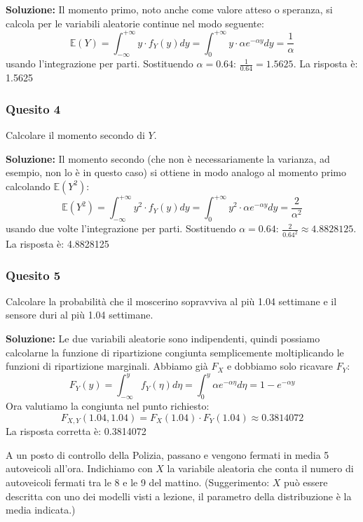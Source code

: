 \documentclass[12pt, a4paper]{article}
\begin{document}
\textbf{Soluzione:}
Il momento primo, noto anche come valore atteso o speranza, si calcola per le variabili aleatorie continue nel modo seguente:
$$ \mathbb{E}(Y) = \int_{-\infty}^{+\infty} y \cdot f_Y(y) dy = \int_0^{+\infty} y \cdot \alpha e^{-\alpha y} dy = \frac{1}{\alpha} $$
usando l’integrazione per parti. Sostituendo $\alpha=0.64$: $\frac{1}{0.64} = 1.5625$.
La risposta è: 1.5625

\newpage

\subsubsection*{Quesito 4}
Calcolare il momento secondo di $Y$.

\textbf{Soluzione:}
Il momento secondo (che non è necessariamente la varianza, ad esempio, non lo è in questo caso) si ottiene in modo analogo al momento primo calcolando $\mathbb{E}(Y^2)$:
$$ \mathbb{E}(Y^2) = \int_{-\infty}^{+\infty} y^2 \cdot f_Y(y) dy = \int_0^{+\infty} y^2 \cdot \alpha e^{-\alpha y} dy = \frac{2}{\alpha^2} $$
usando due volte l’integrazione per parti. Sostituendo $\alpha=0.64$: $\frac{2}{0.64^2} \approx 4.8828125$.
La risposta è: 4.8828125

\subsubsection*{Quesito 5}
Calcolare la probabilità che il moscerino sopravviva al più 1.04 settimane e il sensore duri al più 1.04 settimane.

\textbf{Soluzione:}
Le due variabili aleatorie sono indipendenti, quindi possiamo calcolarne la funzione di ripartizione congiunta semplicemente moltiplicando le funzioni di ripartizione marginali. Abbiamo già $F_X$ e dobbiamo solo ricavare $F_Y$:
$$ F_Y(y) = \int_{-\infty}^y f_Y(\eta) d\eta = \int_0^y \alpha e^{-\alpha \eta} d\eta = 1 - e^{-\alpha y} $$
Ora valutiamo la congiunta nel punto richiesto:
$$ F_{X,Y}(1.04, 1.04) = F_X(1.04) \cdot F_Y(1.04) \approx 0.3814072 $$
La risposta corretta è: 0.3814072


\vspace{0.5cm}
\begin{tcolorbox}[colback=lightergray!10, colframe=tocsec, title=\textbf{Esercizio 4}]
A un posto di controllo della Polizia, passano e vengono fermati in media 5 autoveicoli all’ora. Indichiamo con $X$ la variabile aleatoria che conta il numero di autoveicoli fermati tra le 8 e le 9 del mattino. (Suggerimento: $X$ può essere descritta con uno dei modelli visti a lezione, il parametro della distribuzione è la media indicata.)
\end{tcolorbox}
\end{document}
